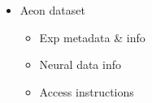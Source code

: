 \begin{itemize}
\begin{itemize}
        \item Access instructions
    
    \end{itemize}
    
    \item Aeon dataset
    \begin{itemize}
        \item Exp metadata \& info
        \item Neural data info
        \item Access instructions
    \end{itemize}
    
\end{itemize}
